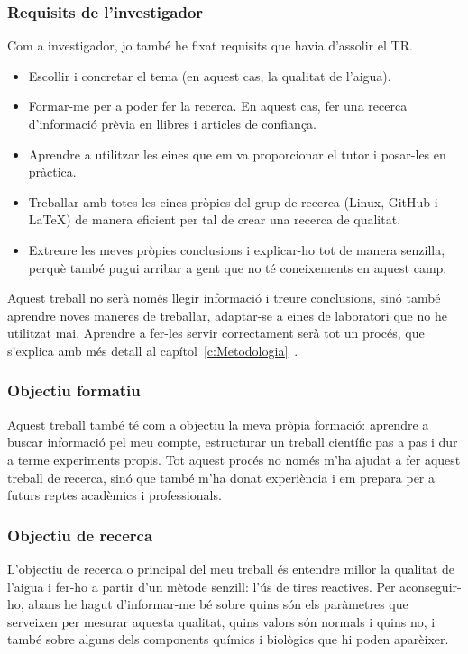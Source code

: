 \subsubsection*{Requisits de l'investigador}
Com a investigador, jo també he fixat requisits que havia d'assolir el TR.
\begin{itemize}
    \item Escollir i concretar el tema (en aquest cas, la qualitat de l’aigua).
    \item Formar-me per a poder fer la recerca. En aquest cas, fer una recerca d'informació prèvia en llibres i articles de confiança.
    \item Aprendre a utilitzar les eines que em va proporcionar el tutor i posar-les en pràctica.
    \item Treballar amb totes les eines pròpies del grup de recerca (Linux, GitHub i LaTeX) de manera eficient per tal de crear una recerca de qualitat.
    \item Extreure les meves pròpies conclusions i explicar-ho tot de manera senzilla, perquè també pugui arribar a gent que no té coneixements en aquest camp.
\end{itemize}

Aquest treball no serà només llegir informació i treure conclusions, sinó també aprendre noves maneres de treballar, adaptar-se a eines de laboratori que no he utilitzat mai. Aprendre a fer-les servir correctament serà tot un procés, que s'explica amb més detall al capítol~\ref{c:Metodologia}~.

\subsubsection{Objectiu formatiu}
Aquest treball també té com a objectiu la meva pròpia formació: aprendre a buscar informació pel meu compte, estructurar un treball científic pas a pas i dur a terme experiments propis. Tot aquest procés no només m’ha ajudat a fer aquest treball de recerca, sinó que també m’ha donat experiència i em prepara per a futurs reptes acadèmics i professionals.

\subsubsection{Objectiu de recerca}
L’objectiu de recerca o principal del meu treball és entendre millor la qualitat de l’aigua i fer-ho a partir d’un mètode senzill: l’ús de tires reactives. Per aconseguir-ho, abans he hagut d’informar-me bé sobre quins són els paràmetres que serveixen per mesurar aquesta qualitat, quins valors són normals i quins no, i també sobre alguns dels components químics i biològics que hi poden aparèixer.



